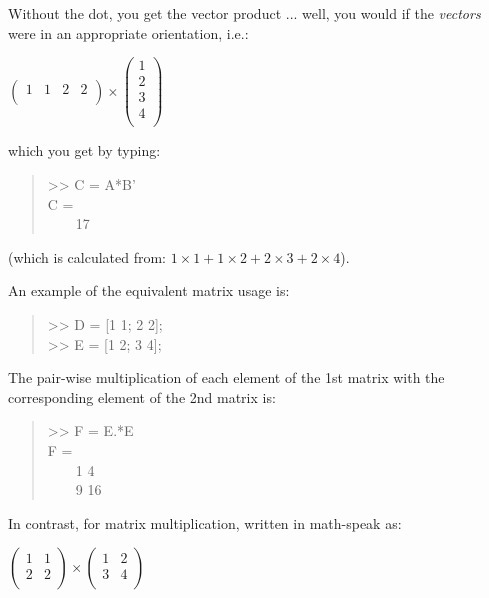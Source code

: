 \documentclass{tufte-book} %
\newenvironment{docspec}{\begin{quotation}\ttfamily\parskip0pt\parindent0pt\ignorespaces}{\end{quotation}}
\begin{document}
Without the dot, you get the vector product ... well, you would if the \textit{vectors} were in an appropriate orientation, i.e.:

\vspace{1mm}
\(\begin{pmatrix}1 & 1 & 2 & 2 \\
\end{pmatrix}\times\begin{pmatrix}1 \\
2 \\
3 \\
4 \\
\end{pmatrix}\)
\vspace{1mm}

\noindent which you get by typing:

\begin{docspec}
>> C = A*B'
\\
C =\\
\ \ \ \ 17
\end{docspec}
(which is  calculated from: \(1\times1 + 1\times2 + 2\times3 + 2\times4\)).

An example of the equivalent matrix usage is:

\begin{docspec}
>> D = [1 1; 2 2];\\
>> E = [1 2; 3 4];
\end{docspec}

The pair-wise multiplication of each element of the 1st matrix with the corresponding element of the 2nd matrix is:
\begin{docspec}
>> F = E.*E
\\
F =\\
\ \ \ \ 1     4\\
\ \ \ \ 9    16
\end{docspec}

In contrast, for matrix multiplication, written in math-speak as:

\vspace{2mm}
\(\begin{pmatrix}1 & 1 \\
2 & 2 \\
\end{pmatrix}\times\begin{pmatrix}1 & 2 \\
3 & 4 \\
\end{pmatrix}\)
\vspace{2mm}
\end{document}
